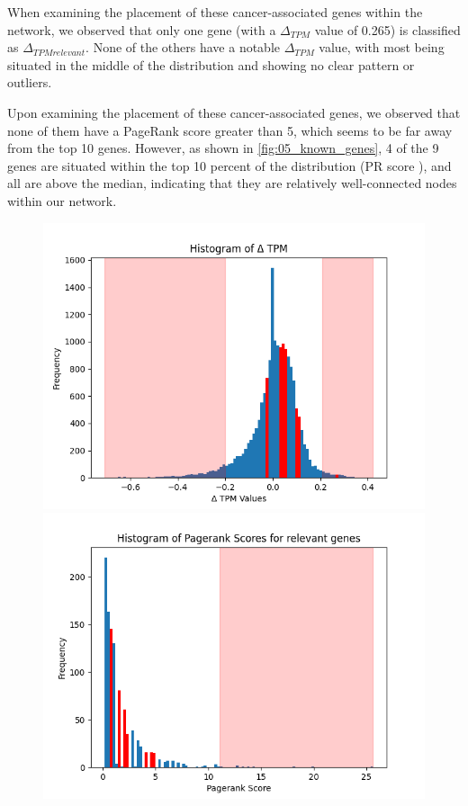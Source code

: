 When examining the placement of these cancer-associated genes within the network,
we observed that only one gene (with a $\Delta_{TPM}$ value of 0.265) is classified as $\Delta_{TPM relevant}$.
None of the others have a notable $\Delta_{TPM}$ value,
with most being situated in the middle of the distribution and showing no clear pattern or outliers.

Upon examining the placement of these cancer-associated genes, we observed that none of them have a PageRank score greater than 5,
which seems to be far away from the top 10 genes.
However, as shown in \cref{fig:05_known_genes},
4 of the 9 genes are situated within the top 10 percent of the distribution (PR score ),
and all are above the median, indicating that they are relatively well-connected nodes within our network.

\begin{figure}[h]
        \includegraphics[width=\linewidth]{figures/05_01_delta_tpm_relevant}
    \endminipage
    \hfill
      \includegraphics[width=\linewidth]{figures/05_01_pagerank_known_genes}

\end{figure}
